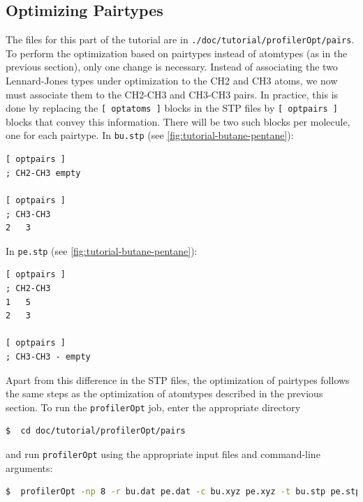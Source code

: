 \documentclass[10pt,a4paper,openany]{memoir}
\numberwithin{equation}{section}
\newcommand{\profileropt}[0]{\texttt{profilerOpt}}
\begin{document}
\subsection{Optimizing Pairtypes}
\label{sec:tutorial-profileropt-pairs}

The files for this part of the tutorial are in
\texttt{./doc/tutorial/profilerOpt/pairs}.  To perform the
optimization based on pairtypes instead of atomtypes (as in the
previous section), only one change is necessary.  Instead of
associating the two Lennard-Jones types under optimization to the CH2
and CH3 atoms, we now must associate them to the CH2-CH3 and CH3-CH3
pairs.  In practice, this is done by replacing the
\texttt{[~optatoms~]} blocks in the STP files by \texttt{[~optpairs~]}
blocks that convey this information. There will be two such blocks per
molecule, one for each pairtype. In \texttt{bu.stp}
(see \autoref{fig:tutorial-butane-pentane}):

\begin{lstlisting}[language=gromacs]
[ optpairs ]
; CH2-CH3 empty

[ optpairs ]
; CH3-CH3
2   3
\end{lstlisting}\vspace{2ex}\par

\noindent In \texttt{pe.stp}
(see \autoref{fig:tutorial-butane-pentane}):

\begin{lstlisting}[language=gromacs]
[ optpairs ]
; CH2-CH3
1   5
2   3

[ optpairs ]
; CH3-CH3 - empty
\end{lstlisting}\vspace{2ex}\par

Apart from this difference in the STP files, the optimization of
pairtypes follows the same steps as the optimization of atomtypes
described in the previous section.
%
To run the \profileropt{} job, enter the appropriate directory

\begin{lstlisting}[language=bash]
$  cd doc/tutorial/profilerOpt/pairs
\end{lstlisting}\vspace{2ex}\par

\noindent
and run \profileropt{} using the appropriate input files and 
command-line arguments:

\begin{lstlisting}[language=bash]
$  profilerOpt -np 8 -r bu.dat pe.dat -c bu.xyz pe.xyz -t bu.stp pe.stp -i run.inp -op pairs
\end{lstlisting}\vspace{2ex}\par
\end{document}
